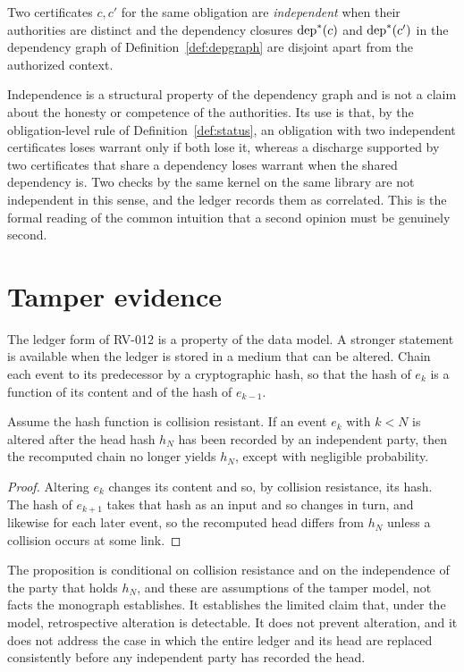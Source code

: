 \begin{definition}[Independence]
Two certificates $c, c'$ for the same obligation are \emph{independent} when their authorities are distinct and the dependency closures $\operatorname{dep}^*(c)$ and $\operatorname{dep}^*(c')$ in the dependency graph of Definition~\ref{def:depgraph} are disjoint apart from the authorized context.
\end{definition}

Independence is a structural property of the dependency graph and is not a claim about the honesty or competence of the authorities. Its use is that, by the obligation-level rule of Definition~\ref{def:status}, an obligation with two independent certificates loses warrant only if both lose it, whereas a discharge supported by two certificates that share a dependency loses warrant when the shared dependency is. Two checks by the same kernel on the same library are not independent in this sense, and the ledger records them as correlated. This is the formal reading of the common intuition that a second opinion must be genuinely second.

\section{Tamper evidence}

The ledger form of RV-012 is a property of the data model. A stronger statement is available when the ledger is stored in a medium that can be altered. Chain each event to its predecessor by a cryptographic hash, so that the hash of $e_{k}$ is a function of its content and of the hash of $e_{k-1}$.

\begin{proposition}
\label{prop:tamper}
Assume the hash function is collision resistant. If an event $e_k$ with $k < N$ is altered after the head hash $h_N$ has been recorded by an independent party, then the recomputed chain no longer yields $h_N$, except with negligible probability.
\end{proposition}

\begin{proof}
Altering $e_k$ changes its content and so, by collision resistance, its hash. The hash of $e_{k+1}$ takes that hash as an input and so changes in turn, and likewise for each later event, so the recomputed head differs from $h_N$ unless a collision occurs at some link.
\end{proof}

The proposition is conditional on collision resistance and on the independence of the party that holds $h_N$, and these are assumptions of the tamper model, not facts the monograph establishes. It establishes the limited claim that, under the model, retrospective alteration is detectable. It does not prevent alteration, and it does not address the case in which the entire ledger and its head are replaced consistently before any independent party has recorded the head.

